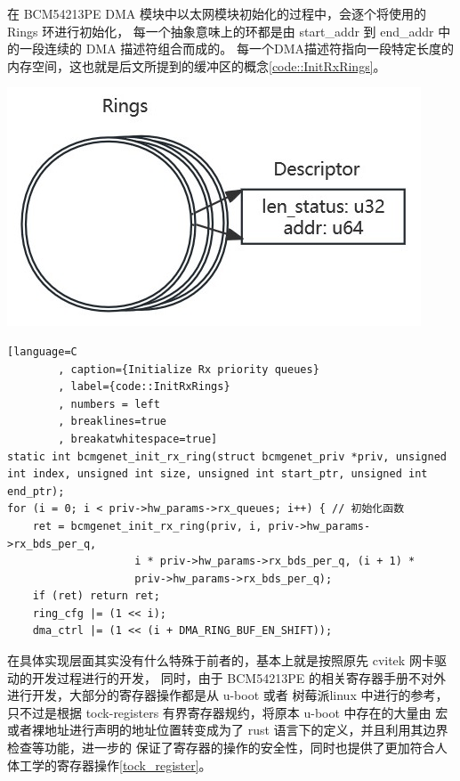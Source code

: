     \begin{adjustwidth}{0cm}{} %
    \begin{minipage}[b]{0.5\linewidth}
        \setlength{\parindent}{2em} %
        在 BCM54213PE DMA 模块中以太网模块初始化的过程中，会逐个将使用的 Rings 环进行初始化，
        每一个抽象意味上的环都是由 start\_addr 到 end\_addr 中的一段连续的 DMA 描述符组合而成的。
        每一个DMA描述符指向一段特定长度的内存空间，这也就是后文所提到的缓冲区的概念\ref{code::InitRxRings}。

    \end{minipage}
    \hfill
    \begin{minipage}[b]{0.45\linewidth}
        \includegraphics[scale=0.6]{./imgs/Rings_and_Descs.jpg}        
    \end{minipage}
    \end{adjustwidth}

    \begin{lstlisting}[language=C
        , caption={Initialize Rx priority queues}
        , label={code::InitRxRings}
        , numbers = left
        , breaklines=true
        , breakatwhitespace=true]
static int bcmgenet_init_rx_ring(struct bcmgenet_priv *priv, unsigned int index, unsigned int size, unsigned int start_ptr, unsigned int end_ptr);
for (i = 0; i < priv->hw_params->rx_queues; i++) { // 初始化函数
    ret = bcmgenet_init_rx_ring(priv, i, priv->hw_params->rx_bds_per_q,
                    i * priv->hw_params->rx_bds_per_q, (i + 1) *
                    priv->hw_params->rx_bds_per_q);
    if (ret) return ret;
    ring_cfg |= (1 << i);
    dma_ctrl |= (1 << (i + DMA_RING_BUF_EN_SHIFT));
    \end{lstlisting}

    
    在具体实现层面其实没有什么特殊于前者的，基本上就是按照原先 cvitek 网卡驱动的开发过程进行的开发，
    同时，由于 BCM54213PE 的相关寄存器手册不对外进行开发，大部分的寄存器操作都是从 u-boot 或者 树莓派linux
    中进行的参考，只不过是根据 tock-registers 有界寄存器规约，将原本 u-boot 中存在的大量由
    宏或者裸地址进行声明的地址位置转变成为了 rust 语言下的定义，并且利用其边界检查等功能，进一步的
    保证了寄存器的操作的安全性，同时也提供了更加符合人体工学的寄存器操作\ref{tock_register}。

